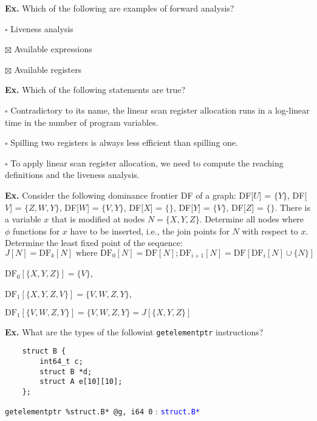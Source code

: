 \hrulefill

\textbf{Ex.} Which of the following are examples of forward analysis?
\begin{compactitem}
	\item[$\square$] Liveness analysis
	\item[$\boxtimes$] Available expressions
	\item[$\boxtimes$] Available registers
\end{compactitem}

\hrulefill

\textbf{Ex.} Which of the following statements are true?
\begin{compactitem}
	\item[$\square$] Contradictory to its name, the linear scan register allocation runs in a log-linear time in the number of program variables.
	\item[$\square$] Spilling two registers is always less efficient than spilling one.
	\item[$\square$] To apply linear scan register allocation, we need to compute the reaching definitions and the liveness analysis.
\end{compactitem}

\hrulefill

\textbf{Ex.} Consider the following dominance frontier DF of a graph:
DF[$ U $] = $\{ Y \}$,
DF[$ V $] = $\{ Z, W, Y \}$,
DF[$ W $] = $\{ V, Y \}$,
DF[$ X $] = $\{  \}$,
DF[$ Y $] = $\{ V \}$,
DF[$ Z $] = $\{  \}$.
There is a variable $x$ that is modified at nodes $N = \{X, Y, Z\}$. Determine all nodes
where $\phi$ functions for $x$ have to be inserted, i.e., the join points for $N$ with respect to $x$.
Determine the least fixed point of the sequence:
$$J[N] = \text{DF}_k[N] \text{ where } \text{DF}_0[N] = \text{DF}[N]; \text{DF}_{i+1}[N] = \text{DF}[\text{DF}_i[N] \cup \{N\}]$$\smallskip

$\text{DF}_0[\{X, Y, Z\}] = \{V\}$, 

$\text{DF}_1[\{X, Y, Z, V\}] = \{V, W, Z, Y\}$, 

$\text{DF}_1[\{V, W, Z, Y\}] = \{V, W, Z, Y\} = J[\{X, Y, Z\}]$

\hrulefill

\textbf{Ex.} What are the types of the followint \texttt{getelementptr} instructions?
\begin{lstlisting}
	struct B {
		int64_t c;
		struct B *d;
		struct A e[10][10];
	}; 
\end{lstlisting}

\texttt{getelementptr \%struct.B* @g, i64 0} : \textcolor{blue}{\texttt{struct.B*}}

